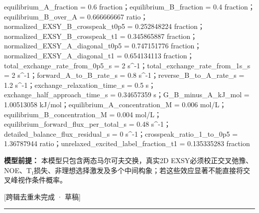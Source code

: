 \documentclass[UTF8,11pt,a4paper]{ctexart}
\begin{document}
equilibrium\_A\_fraction = 0.6 fraction；equilibrium\_B\_fraction = 0.4 fraction；equilibrium\_B\_over\_A = 0.666666667 ratio；normalized\_EXSY\_B\_crosspeak\_t0p5 = 0.252848224 fraction；normalized\_EXSY\_B\_crosspeak\_t1 = 0.345865887 fraction；normalized\_EXSY\_A\_diagonal\_t0p5 = 0.747151776 fraction；normalized\_EXSY\_A\_diagonal\_t1 = 0.654134113 fraction；total\_exchange\_rate\_from\_0p5\_s = 2 s\textasciicircum{}-1；total\_exchange\_rate\_from\_1s\_s = 2 s\textasciicircum{}-1；forward\_A\_to\_B\_rate\_s = 0.8 s\textasciicircum{}-1；reverse\_B\_to\_A\_rate\_s = 1.2 s\textasciicircum{}-1；exchange\_relaxation\_time\_s = 0.5 s；exchange\_half\_approach\_time\_s = 0.34657359 s；G\_B\_minus\_A\_kJ\_mol = 1.00513058 kJ/mol；equilibrium\_A\_concentration\_M = 0.006 mol/L；equilibrium\_B\_concentration\_M = 0.004 mol/L；equilibrium\_forward\_flux\_per\_total\_s = 0.48 s\textasciicircum{}-1；detailed\_balance\_flux\_residual\_s = 0 s\textasciicircum{}-1；crosspeak\_ratio\_1\_to\_0p5 = 1.36787944 ratio；unrelaxed\_excited\_label\_fraction\_t1 = 0.135335283 fraction\par
\noindent\textbf{模型前提：}
本模型只包含两态马尔可夫交换，真实2D EXSY必须校正交叉弛豫、NOE、T₁损失、非理想选择激发及多个中间构象；若这些效应显著不能直接将交叉峰视作条件概率。\par
\noindent\textcolor{red!65!black}{[跨辑去重未完成 · 草稿]} \par
\medskip\hrule\medskip
{}
\end{document}
